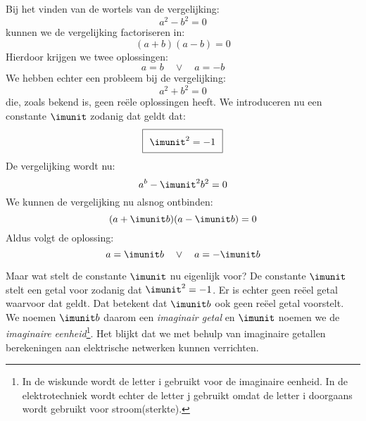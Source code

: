 Bij het vinden van de wortels van de vergelijking:
%
\begin{equation}
a^2 - b^2 = 0
\end{equation}
%
kunnen we de vergelijking factoriseren in:
%
\begin{equation}
(a+b)(a-b) = 0
\end{equation}
%
Hierdoor krijgen we twee oplossingen:
%
\begin{equation}
a=b \quad \vee\quad a=-b
\end{equation}
%
We hebben echter een probleem bij de vergelijking:
%
\begin{equation}
a^2 + b^2 = 0
\end{equation}
%
die, zoals bekend is, geen reële oplossingen heeft. We introduceren nu een constante $\imunit$ zodanig dat geldt dat:
%
\begin{equation}\fboxsep=7pt
\boxed{\imunit^2 = -1}
\end{equation}
%
De vergelijking wordt nu:
%
\begin{equation}
a^b - \imunit^2b^2 = 0
\end{equation}
%
We kunnen de vergelijking nu alsnog ontbinden:
%
\begin{equation}
(a+\imunit b)(a-\imunit b) = 0
\end{equation}
%
Aldus volgt de oplossing:
%
\begin{equation}
a = \imunit b \quad\vee\quad a = -\imunit b
\end{equation}


Maar wat stelt de constante $\imunit$ nu eigenlijk voor? De constante $\imunit$ stelt een getal voor zodanig dat $\imunit^2 = -1$. Er is echter geen reëel getal waarvoor dat geldt. Dat betekent dat $\imunit b$ ook geen reëel getal voorstelt. We noemen $\imunit b$ daarom een \textsl{imaginair getal} en $\imunit$ noemen we de \textsl{imaginaire eenheid}\footnote{In de wiskunde wordt de letter i gebruikt voor de imaginaire eenheid. In de elektrotechniek wordt echter de letter j gebruikt omdat de letter i doorgaans wordt gebruikt voor stroom(sterkte).}. Het blijkt dat we met behulp van imaginaire getallen berekeningen aan elektrische netwerken kunnen verrichten.


